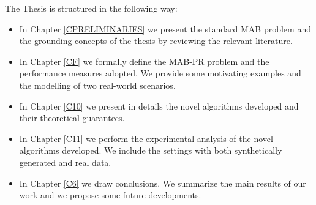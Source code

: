 The Thesis is structured in the following way:
\begin{itemize}
	\item In Chapter \ref{CPRELIMINARIES} we present the standard MAB problem and the grounding concepts of the thesis by reviewing the relevant literature.
	\item In Chapter \ref{CF} we formally define the MAB-PR problem and the performance measures adopted. We provide some motivating examples and the modelling of two real-world scenarios.
	\item In Chapter \ref{C10} we present in details the novel algorithms developed and their theoretical guarantees.
	\item In Chapter \ref{C11} we perform the experimental analysis of the novel algorithms developed. We include the settings with both synthetically generated and real data.  
    \item In Chapter \ref{C6} we draw conclusions. We summarize the main results of our work and we propose some future developments.
\end{itemize}




